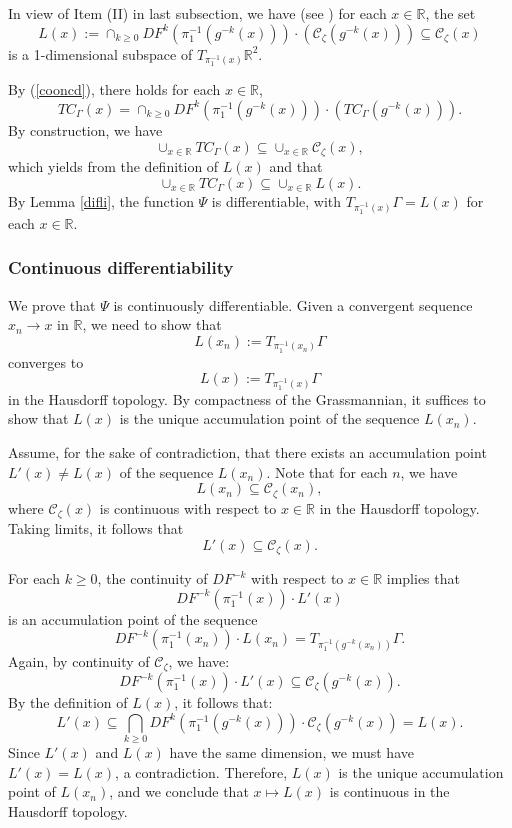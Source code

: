 \documentclass{amsart}
\newcommand{\R}{\mathbb{R}}
\begin{document}
	In view of  Item (II) in last subsection, we have (see \cite[Proof of Theorem 1.2]{Ne}) for each $x\in\R$, the set
	\[L(x):=\cap_{k\geq 0}DF^{k}(\pi_1^{-1}(g^{-k}(x)))\cdot (\mathcal{C}_\zeta(g^{-k}(x)))\subseteq \mathcal{C}_\zeta(x)\]
	is a 1-dimensional subspace of $T_{\pi_1^{-1}(x)}\R^2$.
	
	
	By (\ref{cooncd}), there holds for each $x\in\R$,
	\[TC_{\Gamma}(x)=\cap_{k\geq 0}DF^{k}(\pi_1^{-1}(g^{-k}(x)))\cdot (TC_{\Gamma}(g^{-k}(x))).\]
	By construction, we have
	\[\cup_{x\in\R}TC_{\Gamma}(x)\subseteq \cup_{x\in\R}\mathcal{C}_\zeta(x),\]
	which yields from the definition of $L(x)$ and that
	\[\cup_{x\in\R}TC_{\Gamma}(x)\subseteq \cup_{x\in\R}L(x).\]
	By Lemma \ref{difli}, the function $\Psi$ is differentiable, with $T_{\pi_1^{-1}(x)}\Gamma=L(x)$ for each $x\in \R$.
	
	
	
	
	
	\subsubsection{Continuous differentiability}
	We prove that $\Psi$ is continuously differentiable. Given a convergent sequence \( x_n \to x \) in $\mathbb{R}$, we need to show that
	\[
	L(x_n) := T_{\pi_1^{-1}(x_n)}\Gamma
	\]
	converges to
	\[
	L(x) := T_{\pi_1^{-1}(x)}\Gamma
	\]
	in the Hausdorff topology. By compactness of the Grassmannian, it suffices to show that \( L(x) \) is the unique accumulation point of the sequence \( L(x_n) \).
	
	Assume, for the sake of contradiction, that there exists an accumulation point \( L'(x) \neq L(x) \) of the sequence \( L(x_n) \). Note that for each \( n \), we have
	\[
	L(x_n) \subseteq \mathcal{C}_\zeta(x_n),
	\]
	where \( \mathcal{C}_\zeta(x) \) is continuous with respect to \( x \in \mathbb{R} \) in the Hausdorff topology. Taking limits, it follows that
	\[
	L'(x) \subseteq \mathcal{C}_\zeta(x).
	\]
	
	For each \( k \geq 0 \), the continuity of \( DF^{-k} \) with respect to \( x \in \mathbb{R} \) implies that
	\[
	DF^{-k}(\pi_1^{-1}(x)) \cdot L'(x)
	\]
	is an accumulation point of the sequence
	\[
	DF^{-k}(\pi_1^{-1}(x_n)) \cdot L(x_n) = T_{\pi_1^{-1}(g^{-k}(x_n))}\Gamma.
	\]
	Again, by continuity of \( \mathcal{C}_\zeta \), we have:
	\[
	DF^{-k}(\pi_1^{-1}(x)) \cdot L'(x) \subseteq \mathcal{C}_\zeta(g^{-k}(x)).
	\]
	By the definition of \( L(x) \), it follows that:
	\[
	L'(x) \subseteq \bigcap_{k \geq 0} DF^k(\pi_1^{-1}(g^{-k}(x))) \cdot \mathcal{C}_\zeta(g^{-k}(x)) = L(x).
	\]
	Since \( L'(x) \) and \( L(x) \) have the same dimension, we must have \( L'(x) = L(x) \), a contradiction. Therefore, \( L(x) \) is the unique accumulation point of \( L(x_n) \), and we conclude that \( x \mapsto L(x) \) is continuous in the Hausdorff topology.
	
\end{document}
